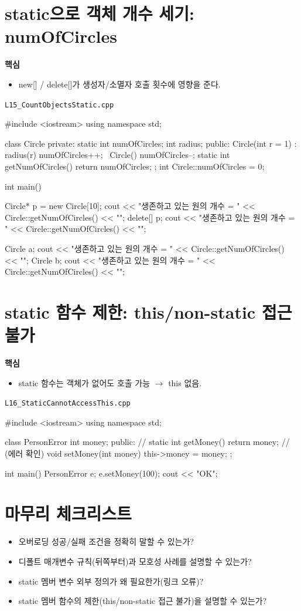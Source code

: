 \documentclass[11pt,a4paper]{article}
\newcommand{\filetag}[1]{\texttt{\color{Accent}#1}}
\begin{document}
\section{static으로 객체 개수 세기: numOfCircles}
\begin{GoalBox}
\textbf{핵심}
\begin{itemize}[leftmargin=18pt]
  \item new[] / delete[]가 생성자/소멸자 호출 횟수에 영향을 준다.
\end{itemize}
\end{GoalBox}

\noindent\filetag{L15\_CountObjectsStatic.cpp}
\begin{cppcode}
#include <iostream>
using namespace std;

class Circle {
private:
    static int numOfCircles;
    int radius;
public:
    Circle(int r = 1) : radius(r) { numOfCircles++; }
    ~Circle() { numOfCircles--; }
    static int getNumOfCircles() { return numOfCircles; }
};
int Circle::numOfCircles = 0;

int main() {
    Circle* p = new Circle[10];
    cout << "생존하고 있는 원의 개수 = " << Circle::getNumOfCircles() << "\n";
    delete[] p;
    cout << "생존하고 있는 원의 개수 = " << Circle::getNumOfCircles() << "\n";

    Circle a;
    cout << "생존하고 있는 원의 개수 = " << Circle::getNumOfCircles() << "\n";
    Circle b;
    cout << "생존하고 있는 원의 개수 = " << Circle::getNumOfCircles() << "\n";
}
\end{cppcode}

\section{static 함수 제한: this/non-static 접근 불가}
\begin{GoalBox}
\textbf{핵심}
\begin{itemize}[leftmargin=18pt]
  \item static 함수는 객체가 없어도 호출 가능 $\rightarrow$ this 없음.
\end{itemize}
\end{GoalBox}

\noindent\filetag{L16\_StaticCannotAccessThis.cpp}
\begin{cppcode}
#include <iostream>
using namespace std;

class PersonError {
    int money;
public:
    // static int getMoney() { return money; } // (에러 확인)
    void setMoney(int money) { this->money = money; }
};

int main() {
    PersonError e;
    e.setMoney(100);
    cout << "OK\n";
}
\end{cppcode}

\section*{마무리 체크리스트}
\begin{GoalBox}
\begin{itemize}[leftmargin=18pt]
  \item 오버로딩 성공/실패 조건을 정확히 말할 수 있는가?
  \item 디폴트 매개변수 규칙(뒤쪽부터)과 모호성 사례를 설명할 수 있는가?
  \item static 멤버 변수 외부 정의가 왜 필요한가(링크 오류)?
  \item static 멤버 함수의 제한(this/non-static 접근 불가)을 설명할 수 있는가?
\end{itemize}
\end{GoalBox}
\end{document}
